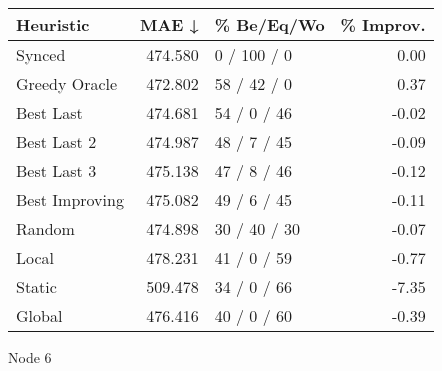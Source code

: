 \begin{tabular}{lrlr}
\toprule
\textbf{Heuristic} & \textbf{MAE ↓} & \textbf{\% Be/Eq/Wo} & \textbf{\% Improv.} \\
\midrule
            Synced &        474.580 &          0 / 100 / 0 &                0.00 \\
     Greedy Oracle &        472.802 &          58 / 42 / 0 &                0.37 \\
         Best Last &        474.681 &          54 / 0 / 46 &               -0.02 \\
       Best Last 2 &        474.987 &          48 / 7 / 45 &               -0.09 \\
       Best Last 3 &        475.138 &          47 / 8 / 46 &               -0.12 \\
    Best Improving &        475.082 &          49 / 6 / 45 &               -0.11 \\
            Random &        474.898 &         30 / 40 / 30 &               -0.07 \\
             Local &        478.231 &          41 / 0 / 59 &               -0.77 \\
            Static &        509.478 &          34 / 0 / 66 &               -7.35 \\
            Global &        476.416 &          40 / 0 / 60 &               -0.39 \\
\bottomrule
\end{tabular}
\caption{Node 6}
\label{tab:iid_lr01_le2_bs2_6}
